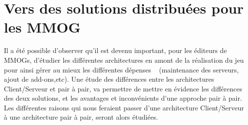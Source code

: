 \section{Vers des solutions distribuées pour les MMOG}
	\label{whyp2p}
	Il a été possible d'observer qu'il est devenu important, pour les éditeurs de MMOGs, d'étudier les différentes architectures en amont de la réalisation du jeu pour ainsi gérer au mieux les différentes dépenses ~\cite{14101410} (maintenance des serveurs, ajout de add-ons,etc). Une étude des différences entre les architectures Client/Serveur et pair à pair, va permettre de mettre en évidence les différences des deux solutions, et les avantages et inconvénients d'une approche pair à pair. Les différentes raisons qui nous feraient passer d'une architecture Client/Serveur à une architecture pair à pair, seront alors étudiées. 

